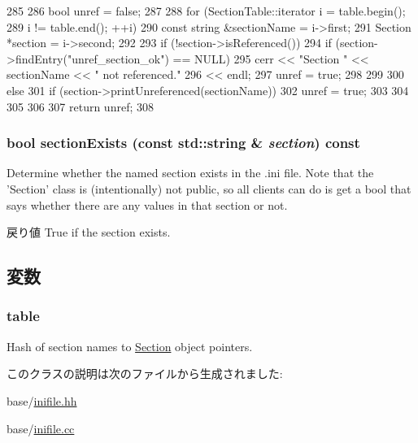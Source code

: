 \begin{DoxyCode}
285 {
286     bool unref = false;
287 
288     for (SectionTable::iterator i = table.begin();
289          i != table.end(); ++i) {
290         const string &sectionName = i->first;
291         Section *section = i->second;
292 
293         if (!section->isReferenced()) {
294             if (section->findEntry("unref_section_ok") == NULL) {
295                 cerr << "Section " << sectionName << " not referenced."
296                      << endl;
297                 unref = true;
298             }
299         }
300         else {
301             if (section->printUnreferenced(sectionName)) {
302                 unref = true;
303             }
304         }
305     }
306 
307     return unref;
308 }
\end{DoxyCode}
\hypertarget{classIniFile_a1f4425e50772e481fcb9eae39b6efa24}{
\subsubsection[{sectionExists}]{\setlength{\rightskip}{0pt plus 5cm}bool sectionExists (const std::string \& {\em section}) const}}
\label{classIniFile_a1f4425e50772e481fcb9eae39b6efa24}
Determine whether the named section exists in the .ini file. Note that the 'Section' class is (intentionally) not public, so all clients can do is get a bool that says whether there are any values in that section or not. \begin{DoxyReturn}{戻り値}
True if the section exists. 
\end{DoxyReturn}


\subsection{変数}
\hypertarget{classIniFile_a18f6b167674b894900920b9e540d3535}{
\subsubsection[{table}]{ {\bf table}}}
\label{classIniFile_a18f6b167674b894900920b9e540d3535}


Hash of section names to \hyperlink{classIniFile_1_1Section}{Section} object pointers. 

このクラスの説明は次のファイルから生成されました:\begin{DoxyCompactItemize}
\item 
base/\hyperlink{inifile_8hh}{inifile.hh}\item 
base/\hyperlink{inifile_8cc}{inifile.cc}\end{DoxyCompactItemize}

